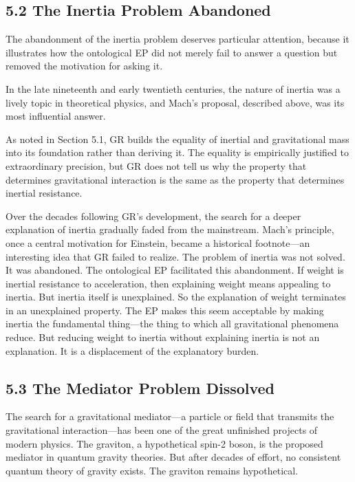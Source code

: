 \documentclass[11pt]{article}
\begin{document}
\subsection{5.2 The Inertia Problem Abandoned}

The abandonment of the inertia problem deserves particular attention, because it illustrates how the ontological EP did not merely fail to answer a question but removed the motivation for asking it.

In the late nineteenth and early twentieth centuries, the nature of inertia was a lively topic in theoretical physics, and Mach's proposal, described above, was its most influential answer.

As noted in Section 5.1, GR builds the equality of inertial and gravitational mass into its foundation rather than deriving it. The equality is empirically justified to extraordinary precision, but GR does not tell us why the property that determines gravitational interaction is the same as the property that determines inertial resistance.

Over the decades following GR's development, the search for a deeper explanation of inertia gradually faded from the mainstream. Mach's principle, once a central motivation for Einstein, became a historical footnote---an interesting idea that GR failed to realize. The problem of inertia was not solved. It was abandoned. The ontological EP facilitated this abandonment. If weight is inertial resistance to acceleration, then explaining weight means appealing to inertia. But inertia itself is unexplained. So the explanation of weight terminates in an unexplained property. The EP makes this seem acceptable by making inertia the fundamental thing---the thing to which all gravitational phenomena reduce. But reducing weight to inertia without explaining inertia is not an explanation. It is a displacement of the explanatory burden.

\subsection{5.3 The Mediator Problem Dissolved}

The search for a gravitational mediator---a particle or field that transmits the gravitational interaction---has been one of the great unfinished projects of modern physics. The graviton, a hypothetical spin-2 boson, is the proposed mediator in quantum gravity theories. But after decades of effort, no consistent quantum theory of gravity exists. The graviton remains hypothetical.
\end{document}

